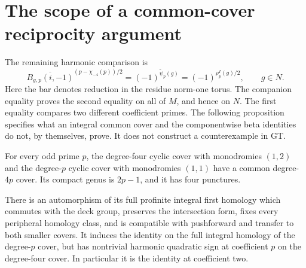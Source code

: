 \section{The scope of a common-cover reciprocity argument}
\label{sec:common-cover-reciprocity-limits}

The remaining harmonic comparison is
\begin{equation}
 \overline{B_{g,p}(i,-1)}^{(p-\chi_{-4}(p))/2}
      =(-1)^{\widetilde\psi_p(g)}
      =(-1)^{\rho_p^I(g)/2},\qquad g\in N.               \label{eq:common-cover-reciprocity-question}
\end{equation}
Here the bar denotes reduction in the residue norm-one torus.
The companion equality proves the second equality on all of \(M\),
and hence on \(N\).
The first equality compares two different coefficient primes.
The following proposition specifies what an integral common cover and
the componentwise beta identities do not, by themselves, prove.
It does not construct a counterexample in GT.

\begin{proposition}\label{prop:common-cover-homology-countermodel}
For every odd prime \(p\), the degree-four cyclic cover with
monodromies \((1,2)\) and the degree-\(p\) cyclic cover with
monodromies \((1,1)\) have a common degree-\(4p\) cover.
Its compact genus is \(2p-1\), and it has four punctures.

There is an automorphism of its full profinite integral first
homology which commutes with the deck group, preserves the
intersection form, fixes every peripheral homology class,
and is compatible with pushforward and transfer to both smaller
covers. It induces the identity on the full integral homology
of the degree-\(p\) cover, but has nontrivial harmonic quadratic
sign at coefficient \(p\) on the degree-four cover. In particular
it is the identity at coefficient two.
\end{proposition}

